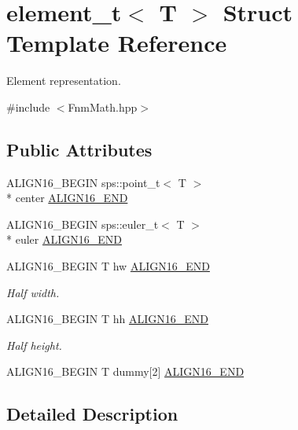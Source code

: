 \hypertarget{structfnm_1_1element__t}{\section{element\+\_\+t$<$ T $>$ Struct Template Reference}
\label{structfnm_1_1element__t}
}


Element representation.  




{\ttfamily \#include $<$Fnm\+Math.\+hpp$>$}

\subsection*{Public Attributes}
\begin{DoxyCompactItemize}
\item 
A\+L\+I\+G\+N16\+\_\+\+B\+E\+G\+I\+N sps\+::point\+\_\+t$<$ T $>$\\*
 center \hyperlink{structfnm_1_1element__t_a1320f8d1d8db5d6492829bb545e52819}{A\+L\+I\+G\+N16\+\_\+\+E\+N\+D}
\item 
A\+L\+I\+G\+N16\+\_\+\+B\+E\+G\+I\+N sps\+::euler\+\_\+t$<$ T $>$\\*
 euler \hyperlink{structfnm_1_1element__t_abb6cbad93f868c1374b91cbef203e31a}{A\+L\+I\+G\+N16\+\_\+\+E\+N\+D}
\item 
A\+L\+I\+G\+N16\+\_\+\+B\+E\+G\+I\+N T hw \hyperlink{structfnm_1_1element__t_ab091fbc55910c6b961a1dd5c69b7076a}{A\+L\+I\+G\+N16\+\_\+\+E\+N\+D}
\begin{DoxyCompactList}\small\item\em Half width. \end{DoxyCompactList}\item 
A\+L\+I\+G\+N16\+\_\+\+B\+E\+G\+I\+N T hh \hyperlink{structfnm_1_1element__t_a089b2ab5959eb8478e45d4ab106327ef}{A\+L\+I\+G\+N16\+\_\+\+E\+N\+D}
\begin{DoxyCompactList}\small\item\em Half height. \end{DoxyCompactList}\item 
A\+L\+I\+G\+N16\+\_\+\+B\+E\+G\+I\+N T dummy\mbox{[}2\mbox{]} \hyperlink{structfnm_1_1element__t_a1452d7d19d990f8a131fb5b8b613d188}{A\+L\+I\+G\+N16\+\_\+\+E\+N\+D}
\end{DoxyCompactItemize}


\subsection{Detailed Description}
